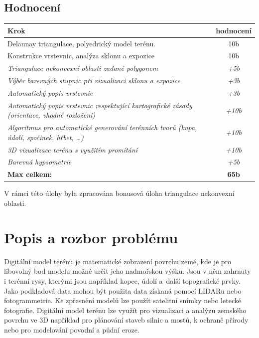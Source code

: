 \documentclass{article}
\begin{document}
\begin{spacing}{1.5}
\subsection*{\textbf{Hodnocení}}
\vspace{0.3cm}
\begin{adjustbox}{width=1\textwidth}
\begin{tabular}{|l|c|}
\hline
\textbf{Krok}                                                                                  & \textbf{hodnocení} \\ \hline
Delaunay triangulace, polyedrický model terénu.                                    &  10b              \\ \hline
Konstrukce vrstevnic, analýza sklonu a expozice                     & 10b    \\ \hline
\textit{Triangulace nekonvexní oblasti zadané polygonem} & \textit{+5b}    \\ \hline
\textit{Výběr barevných stupnic při vizualizaci sklonu a expozice}   & \textit{+3b}    \\ \hline
\textit{Automatický popis vrstevnic} & \textit{+3b} \\ \hline
\textit{Automatický popis vrstevnic respektující kartografické zásady (orientace, vhodné rozložení)}                    & \textit{+10b}    \\ \hline
\textit{Algoritmus pro automatické generování terénních tvarů (kupa, údolí, spočinek, hřbet, …)}                    & \textit{+10b}    \\ \hline
\textit{3D vizualizace terénu s využitím promítání}                    & \textit{+10b}    \\ \hline
\textit{Barevná hypsometrie}                    & \textit{+5b}    \\ \hline
\textbf{Max celkem:}                                                                                  & \textbf{65b} \\ \hline
\end{tabular}
\end{adjustbox}

\vspace{0.2cm}
\noindent V rámci této úlohy byla zpracována bonusová úloha triangulace nekonvexní oblasti.
\newpage

\section{Popis a rozbor problému }
Digitální model terénu je matematické zobrazení povrchu země, kde je pro libovolný bod modelu možné určit jeho nadmořskou výšku. Jsou v něm zahrnuty i terénní rysy, kterými jsou například kopce, údolí a~další topografické prvky. Jako podkladová data mohou být použita data získaná pomocí LIDARu nebo fotogrammetrie. Ke zpřesnění modelů lze použít satelitní snímky nebo letecké fotografie. Digitální model terénu lze využít pro vizualizaci a analýzu zemského povrchu ve 3D například pro plánování staveb silnic a mostů, k ochraně přírody nebo pro modelování povodní a půdní eroze. 


\end{spacing}
\end{document}
